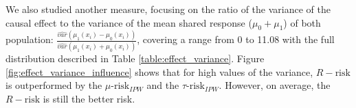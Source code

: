\documentclass[a4paper,num-refs]{oup-contemporary}%
\begin{document}
\begin{table}[!ht]
    \centering
    \caption{Distribution of the causal effect ratio $\Delta_\mu$ for the experiment on causal effect ratio, results in Figure \ref{fig:effect_ratio_influence}.}\label{apd:effect_ratio_distribution}
\end{table}


We also studied another measure, focusing on the ratio of the variance of the causal effect to the variance of the mean shared response ($\mu_0 + \mu_1$) of both population: $\frac{\hat{var}(\mu_{1}(x_i) - \mu_{0}(x_i))}{\hat{var}(\mu_{1}(x_i) + \mu_{0}(x_i))}$, covering a range from 0 to 11.08 with the full
distribution described in Table \ref{table:effect_variance}. Figure
\ref{fig:effect_variance_influence} shows that for high values of the variance,
$R-\text{risk}$ is outperformed by the $\mu\text{-risk}_{IPW}$ and the
$\tau\text{-risk}_{IPW}$. However, on average, the $R-\text{risk}$ is still the
better risk.
\end{document}
